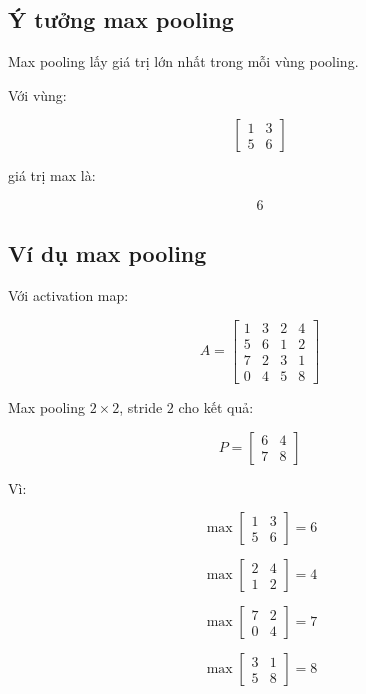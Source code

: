 \subsection{Ý tưởng max pooling}

Max pooling lấy giá trị lớn nhất trong mỗi vùng pooling.

Với vùng:

\[
    \begin{bmatrix}
    1 & 3\\
    5 & 6
    \end{bmatrix}
\]

giá trị max là:

\[
    6
\]

\subsection{Ví dụ max pooling}

Với activation map:

\[
    A =
    \begin{bmatrix}
    1 & 3 & 2 & 4\\
    5 & 6 & 1 & 2\\
    7 & 2 & 3 & 1\\
    0 & 4 & 5 & 8
    \end{bmatrix}
\]

Max pooling $2\times2$, stride $2$ cho kết quả:

\[
    P =
    \begin{bmatrix}
    6 & 4\\
    7 & 8
    \end{bmatrix}
\]

Vì:

\[
    \max
    \begin{bmatrix}
    1 & 3\\
    5 & 6
    \end{bmatrix}
    =
    6
\]

\[
    \max
    \begin{bmatrix}
    2 & 4\\
    1 & 2
    \end{bmatrix}
    =
    4
\]

\[
    \max
    \begin{bmatrix}
    7 & 2\\
    0 & 4
    \end{bmatrix}
    =
    7
\]

\[
    \max
    \begin{bmatrix}
    3 & 1\\
    5 & 8
    \end{bmatrix}
    =
    8
\]

